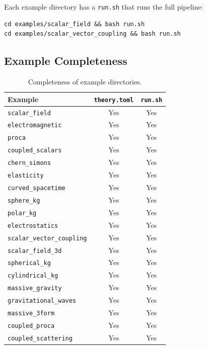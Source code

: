 Each example directory has a \texttt{run.sh} that runs the full pipeline:

\begin{lstlisting}[style=bash]
cd examples/scalar_field && bash run.sh
cd examples/scalar_vector_coupling && bash run.sh
\end{lstlisting}

\subsection{Example Completeness}

\begin{table}[htbp]
\centering
\caption{Completeness of example directories.}
\label{tab:example-completeness}
\begin{tabular}{@{}lcc@{}}
\toprule
Example & \texttt{theory.toml} & \texttt{run.sh} \\
\midrule
\texttt{scalar\_field}            & Yes & Yes \\
\texttt{electromagnetic}          & Yes & Yes \\
\texttt{proca}                    & Yes & Yes \\
\texttt{coupled\_scalars}         & Yes & Yes \\
\texttt{chern\_simons}            & Yes & Yes \\
\texttt{elasticity}               & Yes & Yes \\
\texttt{curved\_spacetime}        & Yes & Yes \\
\texttt{sphere\_kg}               & Yes & Yes \\
\texttt{polar\_kg}                & Yes & Yes \\
\texttt{electrostatics}           & Yes & Yes \\
\texttt{scalar\_vector\_coupling} & Yes & Yes \\
\texttt{scalar\_field\_3d}        & Yes & Yes \\
\texttt{spherical\_kg}            & Yes & Yes \\
\texttt{cylindrical\_kg}          & Yes & Yes \\
\texttt{massive\_gravity}         & Yes & Yes \\
\texttt{gravitational\_waves}     & Yes & Yes \\
\texttt{massive\_3form}           & Yes & Yes \\
\texttt{coupled\_proca}           & Yes & Yes \\
\texttt{coupled\_scattering}      & Yes & Yes \\

\end{tabular}
\end{table}
